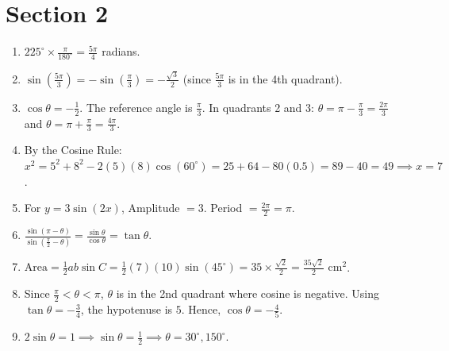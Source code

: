 \documentclass{article}
\begin{document}
\section*{Section 2}
\begin{enumerate}
    
    \item $225^\circ \times \frac{\pi}{180^\circ} = \frac{5\pi}{4}$ radians.
    \vspace{0.5cm}

    \item $\sin\left(\frac{5\pi}{3}\right) = -\sin\left(\frac{\pi}{3}\right) = -\frac{\sqrt{3}}{2}$ (since $\frac{5\pi}{3}$ is in the 4th quadrant).
    \vspace{0.5cm}

    \item $\cos\theta = -\frac{1}{2}$. The reference angle is $\frac{\pi}{3}$. In quadrants 2 and 3:
    $\theta = \pi - \frac{\pi}{3} = \frac{2\pi}{3}$ and $\theta = \pi + \frac{\pi}{3} = \frac{4\pi}{3}$.
    \vspace{0.5cm}

    \item By the Cosine Rule:
    $x^2 = 5^2 + 8^2 - 2(5)(8)\cos(60^\circ) = 25 + 64 - 80(0.5) = 89 - 40 = 49 \implies x = 7$.
    \vspace{0.5cm}

    \item For $y = 3\sin(2x)$, Amplitude $= 3$. Period $= \frac{2\pi}{2} = \pi$.
    \vspace{0.5cm}

    \item $\frac{\sin(\pi - \theta)}{\sin(\frac{\pi}{2} - \theta)} = \frac{\sin \theta}{\cos \theta} = \tan \theta$.
    \vspace{0.5cm}

    \item $\text{Area} = \frac{1}{2}ab\sin C = \frac{1}{2}(7)(10)\sin(45^\circ) = 35 \times \frac{\sqrt{2}}{2} = \frac{35\sqrt{2}}{2} \text{ cm}^2$.
    \vspace{0.5cm}

    \item Since $\frac{\pi}{2} < \theta < \pi$, $\theta$ is in the 2nd quadrant where cosine is negative.
    Using $\tan \theta = -\frac{3}{4}$, the hypotenuse is $5$. Hence, $\cos \theta = -\frac{4}{5}$.
    \vspace{0.5cm}

    \item $2\sin\theta = 1 \implies \sin\theta = \frac{1}{2} \implies \theta = 30^\circ, 150^\circ$.
    \vspace{0.5cm}


\end{enumerate}
\end{document}
